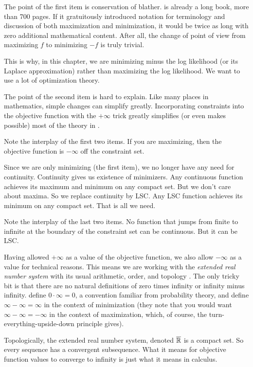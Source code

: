 The point of the first item is conservation of blather.
\citet{rockafellar-wets} is already a long book, more than 700 pages.
If it gratuitously introduced notation for terminology and discussion
of both maximization and minimization, it would be twice as long with
zero additional mathematical content.  After all, the change of point of
view from maximizing $f$ to minimizing $- f$ is truly trivial.

This is why, in this chapter, we are minimizing minus the log likelihood
(or its Laplace approximation) rather than maximizing the log likelihood.
We want to use a lot of optimization theory.

The point of the second item is hard to explain.  Like many places
in mathematics, simple changes can simplify greatly.  Incorporating
constraints into the objective function with the $+\infty$ trick
greatly simplifies (or even makes
possible) most of the theory in \citet{rockafellar-wets}.

Note the interplay of the first two items.  If you are maximizing, then
the objective function is $-\infty$ off the constraint set.

Since we are only minimizing (the first item), we no longer have any need
for continuity.  Continuity gives us existence of minimizers.  Any continuous
function achieves its maximum and minimum on any compact set.  But we don't
care about maxima.  So we replace continuity by LSC.  Any LSC function
achieves its minimum on any compact set.  That is all we need.

Note the interplay of the last two items.  No function that jumps from finite
to infinite at the boundary of the constraint set can be continuous.
But it can be LSC.

Having allowed $+\infty$ as a value of the objective function, we also allow
$-\infty$ as a value for technical reasons.  This means we are working with
the \emph{extended real number system} with its usual arithmetic, order, and
topology \citep[Section~1.E]{rockafellar-wets}.  The only tricky bit is that
there are no natural definitions of zero times infinity or infinity minus
infinity.  \citet{rockafellar-wets} define $0 \cdot \infty = 0$, a convention
familiar from probability theory, and define $\infty - \infty = \infty$ in
the context of minimization (they note that you would
want $\infty - \infty = - \infty$ in the context of maximization, which,
of course, the turn-everything-upside-down principle gives).

Topologically, the extended real number system, denoted $\overline{\mathbb{R}}$ is a compact
set.  So every sequence has a convergent subsequence.  What it means for
objective function values to converge to infinity is just what it means in
calculus.

